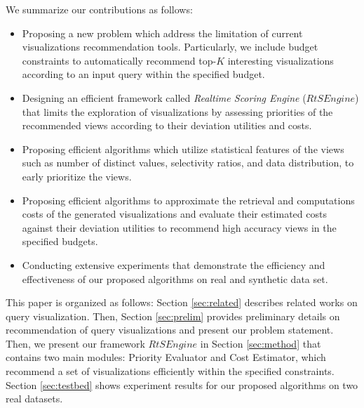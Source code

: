 We summarize our contributions as follows:
%
\begin{itemize}
	\item Proposing a new problem which address the limitation of current visualizations recommendation tools. Particularly, we include budget constraints to automatically
	 recommend top-$K$ interesting visualizations according to an input query within the specified budget.
	 \item Designing an efficient framework called \emph{Realtime Scoring Engine} ($RtSEngine$)
 that limits the exploration of visualizations by assessing priorities of the 
 recommended views according to their deviation utilities and costs.
	\item Proposing efficient algorithms which utilize statistical features of the views such as number 
	of distinct values, selectivity ratios, and data distribution, to early prioritize the views.
	\item Proposing efficient algorithms to approximate the retrieval and computations costs of the generated 
	visualizations and evaluate their estimated costs against their deviation 
	utilities to recommend high accuracy views in the specified budgets.  
	\item Conducting extensive experiments that demonstrate the efficiency and effectiveness of our proposed algorithms on real and synthetic data set.
\end{itemize}
%
This paper is organized as follows: Section \ref{sec:related} describes related works on query visualization. 
%
Then, Section \ref{sec:prelim} provides preliminary details on recommendation of query visualizations and present our problem statement. 
%
Then, we present our framework $RtSEngine$ in Section \ref{sec:method} that contains two main modules: Priority Evaluator and Cost Estimator, which recommend a set of visualizations efficiently within the specified constraints. 
%
Section \ref{sec:testbed} shows experiment results for our proposed algorithms on two real datasets. 
%
